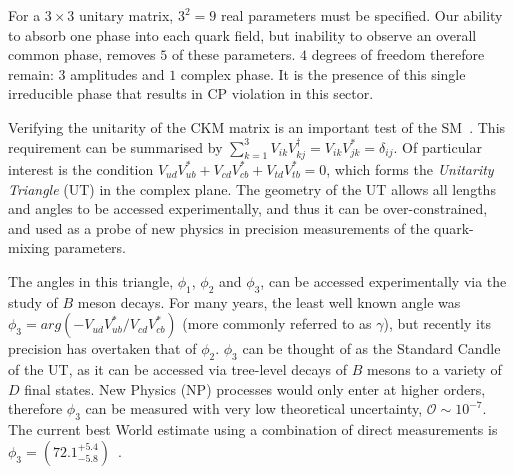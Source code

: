 \documentclass[oneside,12pt]{article}
\begin{document}
For a $3\times 3$ unitary matrix, $3^2=9$ real parameters must be specified. Our
ability to absorb one phase into each quark field, but inability to observe an
overall common phase, removes $5$ of these parameters. $4$ degrees of freedom
therefore remain: $3$ amplitudes and $1$ complex phase. It is the presence of
this single irreducible phase that results in CP violation in this sector.

Verifying the unitarity of the CKM matrix is an important test of the
SM~\cite{CKMTheory}. This requirement can be summarised by
$\sum_{k=1}^{3}V_{ik}V^{\dagger}_{kj}=V_{ik}V^*_{jk}=\delta_{ij}$. Of particular
interest is the condition
$V_{ud}V^{*}_{ub}+V_{cd}V^{*}_{cb}+V_{td}V^{*}_{tb}=0$, which forms the
\emph{Unitarity Triangle} (UT) in the complex plane. The geometry of the UT
allows all lengths and angles to be accessed experimentally, and thus it can be
over-constrained, and used as a probe of new physics in precision measurements
of the quark-mixing parameters. 

The angles in this triangle, $\phi_1$, $\phi_2$ and $\phi_3$, can be accessed
experimentally via the study of $B$ meson decays. For many years, the least well
known angle was $\phi_3=arg(-V_{ud}V^{*}_{ub}/V_{cd}V^{*}_{cb})$ (more commonly
referred to as $\gamma$), but recently its precision has overtaken that of
$\phi_2$. $\phi_3$ can be thought of as the Standard Candle of the UT, as it can
be accessed via tree-level decays of $B$ mesons to a variety of $D$ final
states. New Physics (NP) processes would only enter at higher orders, therefore
$\phi_3$ can be measured with very low theoretical uncertainty, $\mathcal{O}
\sim 10^{-7}$. The current best World estimate using a combination of direct
measurements is $\phi_3=(72.1^{+5.4}_{-5.8})$\degree~\cite{website:CKMFitter}.
\end{document}
